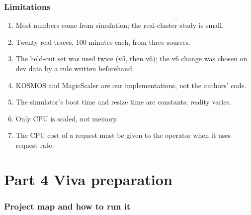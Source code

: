 \documentclass[11pt,a4paper]{article}
\begin{document}
\section{Limitations}
\begin{enumerate}
\item Most numbers come from simulation; the real-cluster study is small.
\item Twenty real traces, 100 minutes each, from three sources.
\item The held-out set was used twice (v5, then v6); the v6 change was chosen on dev data
by a rule written beforehand.
\item KOSMOS and MagicScaler are our implementations, not the authors' code.
\item The simulator's boot time and resize time are constants; reality varies.
\item Only CPU is scaled, not memory.
\item The CPU cost of a request must be given to the operator when it uses request rate.
\end{enumerate}

\newpage
\part*{Part 4 \quad Viva preparation}

\section{Project map and how to run it}
\end{document}
